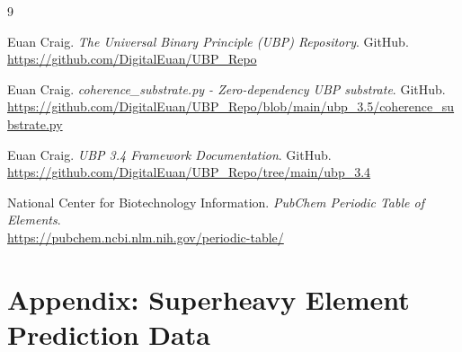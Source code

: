 \documentclass[12pt, a4paper]{article}
\begin{document}
\begin{thebibliography}{9}

Euan Craig. \textit{The Universal Binary Principle (UBP) Repository}. GitHub. \\[-0.5em]
\url{https://github.com/DigitalEuan/UBP_Repo}

Euan Craig. \textit{coherence\_substrate.py - Zero-dependency UBP substrate}. GitHub. \\[-0.5em]
\url{https://github.com/DigitalEuan/UBP_Repo/blob/main/ubp_3.5/coherence\_substrate.py}

Euan Craig. \textit{UBP 3.4 Framework Documentation}. GitHub. \\[-0.5em]
\url{https://github.com/DigitalEuan/UBP_Repo/tree/main/ubp_3.4}

National Center for Biotechnology Information. \textit{PubChem Periodic Table of Elements}. \\[-0.5em]
\url{https://pubchem.ncbi.nlm.nih.gov/periodic-table/}

\end{thebibliography}


\newpage
\appendix
\section{Appendix: Superheavy Element Prediction Data}
\end{document}
